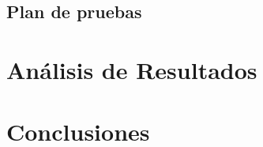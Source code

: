 \documentclass[11pt,a4paper,twocolumn]{article}
\begin{document}
    \subsection{Plan de pruebas}

\section{Análisis de Resultados}



\section{Conclusiones}
\printbibliography[title={Bibliografía}]
\end{document}
